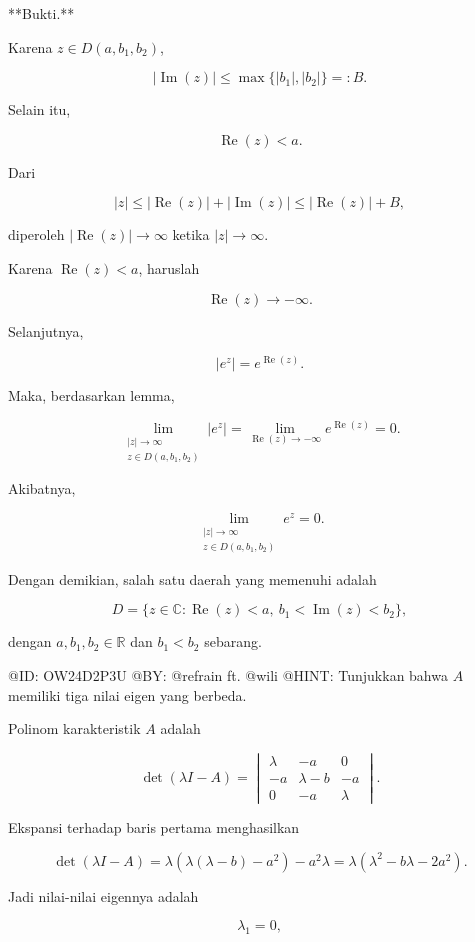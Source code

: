 **Bukti.**

Karena $z\in D(a,b_1,b_2)$,

$$
|\operatorname{Im}(z)|
\le
\max\{|b_1|,|b_2|\}
=:B.
$$

Selain itu,

$$
\operatorname{Re}(z)<a.
$$

Dari

$$
|z|
\le
|\operatorname{Re}(z)|
+
|\operatorname{Im}(z)|
\le
|\operatorname{Re}(z)|+B,
$$

diperoleh $|\operatorname{Re}(z)|\to\infty$ ketika $|z|\to\infty$.

Karena $\operatorname{Re}(z)<a$, haruslah

$$
\operatorname{Re}(z)\to-\infty.
$$

Selanjutnya,

$$
|e^z|
=
e^{\operatorname{Re}(z)}.
$$

Maka, berdasarkan lemma,

$$
\lim_{\substack{|z|\to\infty\\z\in D(a,b_1,b_2)}}
|e^z|
=
\lim_{\operatorname{Re}(z)\to-\infty}
e^{\operatorname{Re}(z)}
=
0.
$$

Akibatnya,

$$
\lim_{\substack{|z|\to\infty\\z\in D(a,b_1,b_2)}}e^z
=
0.
$$

Dengan demikian, salah satu daerah yang memenuhi adalah

$$
\boxed{
D=
\{z\in\mathbb C:\operatorname{Re}(z)<a,\ b_1<\operatorname{Im}(z)<b_2\},
}
$$

dengan $a,b_1,b_2\in\mathbb R$ dan $b_1<b_2$ sebarang.

@ID: OW24D2P3U
@BY: @refrain ft. @wili
@HINT: Tunjukkan bahwa $A$ memiliki tiga nilai eigen yang berbeda.

Polinom karakteristik $A$ adalah

$$
\det(\lambda I-A)
=
\begin{vmatrix}
\lambda&-a&0\\
-a&\lambda-b&-a\\
0&-a&\lambda
\end{vmatrix}.
$$

Ekspansi terhadap baris pertama menghasilkan

$$
\det(\lambda I-A)
=
\lambda(\lambda(\lambda-b)-a^2)-a^2\lambda
=
\lambda(\lambda^2-b\lambda-2a^2).
$$

Jadi nilai-nilai eigennya adalah

$$
\lambda_1=0,
$$

